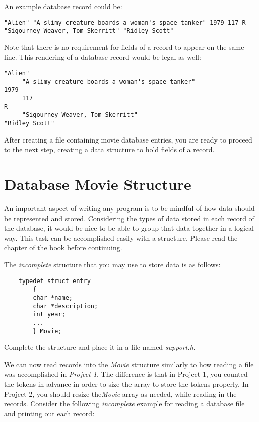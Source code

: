 \documentclass{article}
\begin{document}
An example database record could be:
{\scriptsize
\begin{verbatim}
"Alien" "A slimy creature boards a woman's space tanker" 1979 117 R "Sigourney Weaver, Tom Skerritt" "Ridley Scott"
\end{verbatim}
}

Note that there is no requirement for fields of a record to appear on the same line.
This rendering of a database record would be legal as well:

{\scriptsize
\begin{verbatim}
"Alien" 
     "A slimy creature boards a woman's space tanker"
1979 
     117 
R 
     "Sigourney Weaver, Tom Skerritt"
"Ridley Scott"
\end{verbatim}
}

After creating a file containing movie database entries, you are ready to
proceed to the next step, creating a data structure to hold fields of a record.

\section*{Database Movie Structure}

An important aspect of writing any program is to be mindful of how data should
be represented and stored.  Considering the types of data stored in each record of the database,
it would be nice to be able to group that data together in a logical way.  This task can
be accomplished easily with a structure. 
Please read the 
chapter of the book before continuing.

The {\it incomplete} structure that you may use to store data is as follows:

\begin{verbatim}
    typedef struct entry
        {
        char *name;
        char *description;
        int year;
        ...
        } Movie;
\end{verbatim}

Complete the structure and place it in a file named {\it support.h}.

We can now read records into the {\it Movie} structure similarly
to how reading a file was accomplished in {\it Project 1}.  The difference
is that in Project 1, you counted the tokens in advance in order to
size the array to store the tokens properly. In Project 2,
you should resize the{\it  Movie} array as needed, while reading
in the records.
Consider the
following {\it incomplete} example for reading a database file and printing
out each record:
\end{document}
